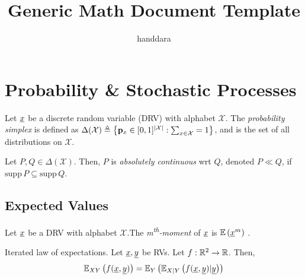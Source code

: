 \documentclass[11pt]{article}
\title{Generic Math Document Template}
\author{handdara}
\begin{document}
\maketitle

\newcommand{\xalph}{\mathcal{X}}
\newcommand{\yalph}{\mathcal{Y}}
\newcommand{\zalph}{\mathcal{Z}}
\newcommand{\xsimp}{\Delta(\xalph)}
\newcommand{\ysimp}{\Delta(\yalph)}
\newcommand{\zsimp}{\Delta(\zalph)}
\newcommand{\letxbeadrv}{Let $\rv x$ be a DRV with alphabet $\xalph$.}

\makenomenclature %
\printnomenclature

\section{Probability \& Stochastic Processes}

\begin{defn}
    Let $\underline{x}$ be a discrete random variable (DRV) with alphabet $\mathcal{X}$. The \emph{probability simplex} is defined as $\Delta (\xalph) \triangleq \left\{\bv p_x \in [0,1]^{|\xalph|} : \sum_{x\in\xalph} = 1 \right\}$, and is the set of all distributions on $\xalph$.
\end{defn}

\begin{defn}
    Let $P,Q\in\Delta(\xalph)$. Then, $P$ is \emph{absolutely continuous} wrt $Q$, denoted $P\ll Q$, if $\mathrm{supp}\,P \subseteq \mathrm{supp}\,Q$.
\end{defn}

\subsection{Expected Values}

\begin{defn}
    \letxbeadrv The \emph{m\textsuperscript{th}-moment} of $\underline{x}$ is $\mathbb{E} \left( \underline{x}^m \right)$ .
\end{defn}

\begin{lemma}\label{lem:iterated_law_of_expvals} Iterated law of expectations.
    Let $\underline{x}, \underline{y}$ be RVs. Let $f:\mathbb{R}^2 \rightarrow \mathbb{R}$. Then,
    \begin{equation}
        \mathbb{E}_{XY} \left( f(\underline{x}, \underline{y}) \right) = \mathbb{E}_{Y} \left( \mathbb{E}_{X|Y} \left( f(\underline{x}, \underline{y}) | \underline{y} \right) \right)
    \end{equation}
\end{lemma}
\end{document}
